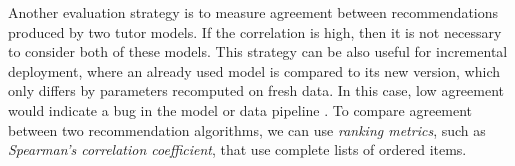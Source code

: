Another evaluation strategy is to measure agreement between recommendations
produced by two tutor models. If the correlation is high, then it is not
necessary to consider both of these models. This strategy can be also useful
for incremental deployment, where an already used model is compared to its
new version, which only differs by parameters recomputed on fresh data.
In this case, low agreement would indicate a bug in the model
or data pipeline \cite[][Rule 24]{google-ml-rules}.
To compare agreement between two recommendation algorithms, we can use
\emph{ranking metrics}, such as \emph{Spearman's correlation coefficient},
that use complete lists of ordered items.



